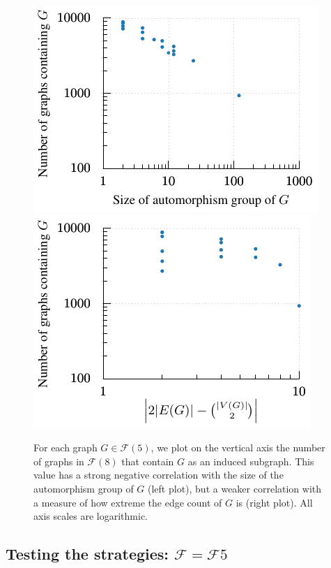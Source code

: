 \documentclass[12pt]{article}
\newcommand{\calF}{\ensuremath{\mathcal{F}}}
\begin{document}
\begin{figure}[htb]
    \centering

      \includegraphics*{img/automorphisms-scatter.pdf}
     \qquad
      \includegraphics*{img/deg-scatter.pdf}
    \caption{For each graph $G \in \calF(5)$, we plot on the vertical axis
    the number of graphs in $\calF(8)$ that contain $G$ as an induced subgraph.
    This value has a strong negative correlation with the size of the automorphism
    group of $G$ (left plot), but a weaker correlation with a measure of how
    extreme the edge count of $G$ is (right plot).
    All axis scales are logarithmic.}
\label{fig:scatter}
\end{figure}

\subsection{Testing the strategies: $\calF = \calF{5}$}
\end{document}
